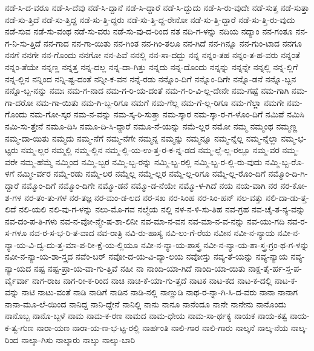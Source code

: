 {ನಡೆ-ಸಿ-ದ-ವರೂ
ನಡೆ-ಸಿ-ದೆವು
ನಡೆ-ಸಿ-ದ್ದಾನೆ
ನಡೆ-ಸಿ-ದ್ದಾರೆ
ನಡೆ-ಸಿ-ದ್ದುದು
ನಡೆ-ಸಿ-ರು-ವುದೇ
ನಡೆ-ಸುತ್ತ
ನಡೆ-ಸುತ್ತಾ
ನಡೆ-ಸು-ತ್ತಿದೆ
ನಡೆ-ಸು-ತ್ತಿದ್ದ
ನಡೆ-ಸು-ತ್ತಿ-ದ್ದರು
ನಡೆ-ಸು-ತ್ತಿ-ದ್ದ-ರೇನೋ
ನಡೆ-ಸು-ತ್ತಿ-ದ್ದಾರೆ
ನಡೆ-ಸು-ತ್ತಿ-ರು-ವುದು
ನಡೆ-ಸುವ
ನಡೆ-ಸು-ವಂಥ
ನಡೆ-ಸು-ವರು
ನಡೆ-ಸು-ವು-ದ-ರಿಂದ
ನತ
ನದಿ-ಗ-ಳನ್ನು
ನದಿಯ
ನದ್ಯಾಂ
ನನ-ಗಂತೂ
ನನ-ಗ-ನಿ-ಸು-ತ್ತಿದೆ
ನನ-ಗಾದ
ನನ-ಗಾ-ಯಿತು
ನನ-ಗಿಂತ
ನನ-ಗಿಂ-ತಲೂ
ನನ-ಗಿದೆ
ನನ-ಗಿನ್ನೂ
ನನ-ಗುಂ-ಟಾದ
ನನಗೂ
ನನಗೆ
ನನಗೇ
ನನ-ಗೊಂದು
ನನಗೋ
ನನ-ಪಿವೆ
ನನಲ್ಲಿ
ನನ-ಸಾ-ದದ್ದು
ನನ್ನ
ನನ್ನಂ-ತಹ
ನನ್ನಂ-ತ-ಹ-ವರು
ನನ್ನಂತೆ
ನನ್ನಂ-ತೆಯೇ
ನನ್ನಣ್ಣ
ನನ್ನತ್ತ
ನನ್ನ-ದಲ್ಲ
ನನ್ನ-ದಾ-ಗಿತ್ತು
ನನ್ನದು
ನನ್ನ-ದೊಂದು
ನನ್ನನ್ನು
ನನ್ನನ್ನೇ
ನನ್ನಲ್ಲಿ
ನನ್ನ-ಲ್ಲಿಗೆ
ನನ್ನ-ಲ್ಲಿನ
ನನ್ನಿಂದ
ನನ್ನಿ-ಷ್ಟ-ದಂತೆ
ನನ್ನೀ-ಕ-ವನ
ನನ್ನೆ-ರಡು
ನನ್ನೊಂ-ದಿಗೆ
ನನ್ನೊಂ-ದಿಗೇ
ನನ್ನೊ-ಡನೆ
ನನ್ನೊ-ಬ್ಬನ
ನನ್ನೊ-ಬ್ಬ-ನನ್ನು
ನಮಃ
ನಮ-ಗ-ನಾದ
ನಮ-ಗ-ರಿ-ಯ-ದಂತೆ
ನಮ-ಗ-ರಿ-ವಿ-ಲ್ಲ-ದೇನೇ
ನಮ-ಗಷ್ಟೆ
ನಮ-ಗಾಗಿ
ನಮ-ಗಾ-ದರೋ
ನಮ-ಗಾ-ಯಿತು
ನಮ-ಗಿ-ಬ್ಬ-ರಿಗೂ
ನಮಗೆ
ನಮ-ಗೆಲ್ಲ
ನಮ-ಗೆ-ಲ್ಲ-ರಿಗೂ
ನಮ-ಗೆಲ್ಲಾ
ನಮಗೇ
ನಮ-ಗೊಂದು
ನಮ-ಗೋ-ಸ್ಕರ
ನಮ-ನ-ವನ್ನು
ನಮ-ಸ್ಕ-ರಿ-ಸುತ್ತಾ
ನಮ-ಸ್ಕಾರ
ನಮ-ಸ್ಕಾ-ರ-ಗ-ಳೊಂ-ದಿಗೆ
ನಮಿಪೆ
ನಮಿಸಿ
ನಮಿ-ಸು-ತ್ತೇನೆ
ನಮೂ-ದಿಸಿ
ನಮೂ-ದಿ-ಸಿ-ದ್ದಾರೆ
ನಮೂ-ನೆ-ಯನ್ನು
ನಮೆ-ಲ್ಲರ
ನಮೋ
ನಮ್ಮ
ನಮ್ಮಂಥ
ನಮ್ಮಣ್ಣ
ನಮ್ಮ-ದಾ-ಯಿತು
ನಮ್ಮದು
ನಮ್ಮ-ನೆಗೆ
ನಮ್ಮ-ನೆಗೇ
ನಮ್ಮನ್ನ
ನಮ್ಮನ್ನು
ನಮ್ಮನ್ನೂ
ನಮ್ಮ-ನ್ನೆಲ್ಲ
ನಮ್ಮ-ನ್ನೆಲ್ಲಾ
ನಮ್ಮ-ಭ-ಟ್ಟರು
ನಮ್ಮ-ಲ್ಲರ
ನಮ್ಮಲ್ಲಿ
ನಮ್ಮ-ಲ್ಲಿನ
ನಮ್ಮ-ಲ್ಲಿ-ಯ-ಉ-ತ್ತ-ರ-ಕ-ನ್ನ-ಡದ
ನಮ್ಮ-ಲ್ಲೆ-ಲ್ಲ-ರಲ್ಲೂ
ನಮ್ಮ-ವರ
ನಮ್ಮ-ವರೇ
ನಮ್ಮ-ಹೆಮ್ಮೆ
ನಮ್ಮಿಂದ
ನಮ್ಮಿ-ಬ್ಬರ
ನಮ್ಮಿ-ಬ್ಬ-ರನ್ನು
ನಮ್ಮಿ-ಬ್ಬ-ರಲ್ಲಿ
ನಮ್ಮಿ-ಬ್ಬ-ರ-ಲ್ಲಿ-ರು-ವುದು
ನಮ್ಮಿ-ಬ್ಬ-ರೊ-ಳಗೆ
ನಮ್ಮೀ-ರ್ವರ
ನಮ್ಮೆ-ರಡು
ನಮ್ಮೆ-ಲರ
ನಮ್ಮೆಲ್ಲ
ನಮ್ಮೆ-ಲ್ಲರ
ನಮ್ಮೆ-ಲ್ಲ-ರಿಗೂ
ನಮ್ಮೆ-ಲ್ಲ-ರೊಂ-ದಿಗೆ
ನಮ್ಮೊಂ-ದಿ-ಗಿ-ದ್ದಾರೆ
ನಮ್ಮೊಂ-ದಿಗೆ
ನಮ್ಮೊಂ-ದಿಗೇ
ನಮ್ಮೊ-ಡನೆ
ನಮ್ಮೊ-ಡ-ನೆಯೇ
ನಮ್ಮೊ-ಳ-ಗಿದೆ
ನಯ
ನಯ-ವಾಗಿ
ನರ
ನರ-ಕೋ-ಶ-ಗಳ
ನರ-ತಂ-ತು-ಗಳ
ನರ-ತಜ್ಞ
ನರ-ಮಂ-ಡ-ಲದ
ನರ-ಸಖ
ನರ-ಸಿಂಹ
ನರ-ಸಿಂ-ಹನ್
ನಲ-ವತ್ತು
ನಲಿ-ದಾ-ಡು-ತ್ತ-ಲಿದೆ
ನಲಿ-ಯಲಿ
ನಲಿ-ವು-ಗ-ಳನ್ನು
ನಲು-ಮೊ-ಗವ
ನಲ್ಮೆಯ
ನಲ್ಲಿ
ನಳ-ನ-ಳಿ-ಸು-ತಿಹ
ನವ-ಗ್ರಹ
ನವ-ಚೈ-ತ-ನ್ಯ-ವನ್ನು
ನವ-ದಂ-ಪ-ತಿ-ಗಳು
ನವ-ನ-ವೋ-ನ್ಮೇ-ಷ-ಶಾ-ಲಿನೀ
ನವ-ಮಾ-ನ-ವನ
ನವ-ಮಾ-ನ-ವ-ನನ್ನು
ನವ-ಯು-ಗದಿ
ನವ-ರ-ಸ-ಗಳೂ
ನವ-ರ-ಸ-ಭ-ರಿ-ತ-ವಾದ
ನವ-ರಾತ್ರಿ
ನವಿ-ರು-ಹಾಸ್ಯ
ನವಿ-ಲು-ಗೆ-ರೆಯ
ನವೀನ
ನವೀ-ನ-ನ್ಯಾಯ
ನವೀ-ನ-ನ್ಯಾ-ಯ-ವಿ-ದ್ವ-ದು-ತ್ತ-ಮಾ-ಪ-ರೀ-ಕ್ಷೆ-ಯ-ಲ್ಲಿಯೂ
ನವೀ-ನ-ನ್ಯಾ-ಯ-ಶಾಸ್ತ್ರ
ನವೀ-ನ-ನ್ಯಾ-ಯ-ಶಾ-ಸ್ತ್ರ-ಗ್ರಂ-ಥ-ಗ-ಳನ್ನು
ನವೀ-ನ-ನ್ಯಾ-ಯ-ಶಾ-ಸ್ತ್ರದ
ನವೆಂ-ಬರ್
ನವೋ-ದ-ಯ-ವಿ-ದ್ಯಾ-ಲಯ
ನವೋಸ್ತು
ನವ್ಯ-ತೆ-ಯನ್ನು
ನವ್ಯ-ನ್ಯಾಯ
ನವ್ಯ-ನ್ಯಾ-ಯದ
ನಷ್ಟ
ನಷ್ಟ-ಪ್ರಾ-ಯ-ವಾ-ಗು-ತ್ತಿವೆ
ನಹೀ
ನಾ
ನಾಂದಿ-ಯಾ-ಗಿದೆ
ನಾಂದಿ-ಯಾ-ಯಿತು
ನಾಕ್ಷ-ತೈ-ರ್ಹ-ಸ್ತ-ಪ-ರ್ವೈರ್ವಾ
ನಾಗ-ರಾಜ
ನಾಗ-ರೀ-ಕ-ರಿಂದ
ನಾಚಿ
ನಾಚಿ-ಕೆ-ಯಾ-ಗು-ತ್ತದೆ
ನಾಟಕ
ನಾಟ-ಕದ
ನಾಟ-ಕ-ದಲ್ಲಿ
ನಾಟ-ಕ-ವನ್ನು
ನಾಟಿ
ನಾಟು-ವಂತೆ
ನಾಡಿ
ನಾಡಿಗೆ
ನಾಡಿನ
ನಾಡಿ-ನಲ್ಲಿ
ನಾಣ್ಣುಡಿ
ನಾಥ-ರ-ನ್ನಾ-ಗಿ-ಸಿ-ದ-ವರು
ನಾನಾ
ನಾನಾಗ
ನಾನಾ-ಮೂ-ಲೆ-ಯಿಂದ
ನಾನಿದ್ದ
ನಾನಿ-ದ್ದೇನೆ
ನಾನಿಲ್ಲಿ
ನಾನು
ನಾನೂ
ನಾನೆಂದೂ
ನಾನೇ
ನಾನೇನು
ನಾನೊಂದು
ನಾನೊಬ್ಬ
ನಾನೊ-ಬ್ಬಳೆ
ನಾಮ
ನಾಮ-ಕ-ರಣ
ನಾಮದ
ನಾಮ-ಧೇಯ
ನಾಮ-ಸಾ-ರ್ಥಕ್ಯ
ನಾಯಕ
ನಾಯ-ಕತ್ವ
ನಾಯ-ಕ-ತ್ವ-ಗುಣ
ನಾರಾ-ಯಣ
ನಾರಾ-ಯ-ಣ-ಭ-ಟ್ಟ-ರಲ್ಲಿ
ನಾರ್ಹಂತಿ
ನಾಲಿ-ಗಾರ
ನಾಲಿ-ಗಾರು
ನಾಲ್ಕನೆ
ನಾಲ್ಕ-ನೆಯ
ನಾಲ್ಕ-ರಿಂದ
ನಾಲ್ಕಾ-ಗಿಸು
ನಾಲ್ಕಾರು
ನಾಲ್ಕು
ನಾಲ್ಕು-ಬಾರಿ
}
